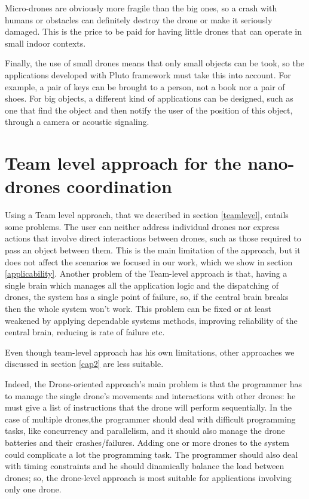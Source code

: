Micro-drones are obviously more fragile than the big ones, so a crash with humans or obstacles can definitely destroy the drone or make it seriously damaged. This is the price to be paid for having little drones that can operate in small indoor contexts.

Finally, the use of small drones means that only small objects can be took, so the applications developed with Pluto framework must take this into account.
For example, a pair of keys can be brought to a person, not a book nor a pair of shoes. For big objects, a different kind of applications can be designed, such as one that find the object and then notify the user of the position of this object, through a camera or acoustic signaling.




\newpage


\section{Team level approach for the nano-drones coordination}\label{teamlevelproblems}


Using a Team level approach, that we described in section \ref{teamlevel}, entails some problems. 
The user can neither address individual drones nor express actions that involve direct interactions between drones, such as those required to pass an object between them.
This is the main limitation of the approach, but it does not affect the scenarios we focused in our work, which we show in section \ref{applicability}.
Another problem of the Team-level approach is that, having a single brain which manages all the application logic and the dispatching of drones, the system has a single point of failure, so, if the central brain breaks then the whole system won't work.
This problem can be fixed or at least weakened by applying dependable systems methods, improving reliability of the central brain, reducing is rate of failure etc.

Even though team-level approach has his own limitations, other approaches we discussed in section \ref{cap2} are less suitable.

Indeed, the Drone-oriented approach's main problem is that the programmer has to manage the single drone's movements and interactions with other drones: he must give a list of instructions that the drone will perform sequentially.
In the case of multiple drones,the programmer should deal with difficult programming tasks, like concurrency and parallelism, and it should also manage the drone batteries and their crashes/failures.
Adding one or more drones to the system could complicate a lot the programming task. The programmer should also deal with timing constraints and he should dinamically balance the load between drones; so, the drone-level approach is most suitable for applications involving only one drone.

